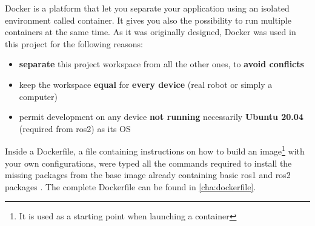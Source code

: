 Docker is a platform that let you separate your application using an isolated environment called container. It gives you also the possibility to run multiple containers at the same time. As it was originally designed, Docker was used in this project for the following reasons: %
  
\begin{itemize}
    \item \textbf{separate} this project workspace from all the other ones, to \textbf{avoid conflicts}
    \item keep the workspace \textbf{equal} for \textbf{every device} (real robot or simply a computer)
    \item permit development on any device \textbf{not running} necessarily \textbf{Ubuntu 20.04} (required from \acrshort{ros}2) as its OS
\end{itemize}  
  
Inside a Dockerfile, a file containing instructions on how to build an image\footnote{It is used as a starting point when launching a container} with your own configurations, were typed all the commands required to install the missing packages from the base image already containing basic \acrshort{ros}1 and \acrshort{ros}2 packages \cite{dockerimage}. The complete Dockerfile can be found in \autoref{cha:dockerfile}.